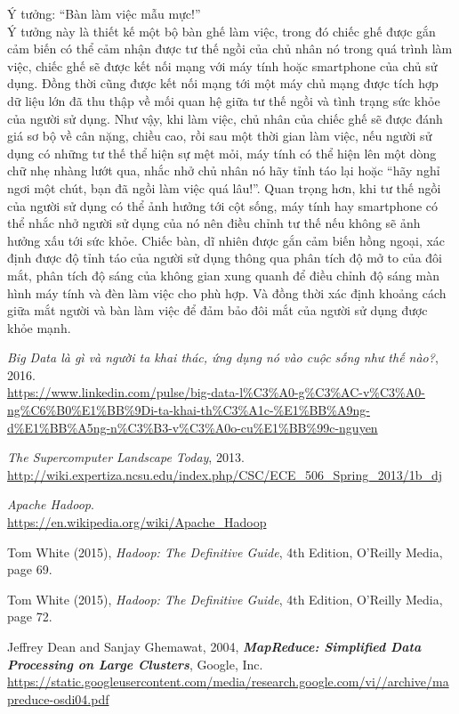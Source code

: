\documentclass[12pt]{report}
\begin{document}
Ý tưởng: “Bàn làm việc mẫu mực!” \\
Ý tưởng này là thiết kế một bộ bàn ghế làm việc, trong đó chiếc ghế được gắn cảm biến có thể cảm nhận được tư thế ngồi của chủ nhân nó trong quá trình làm việc, chiếc ghế sẽ được kết nối mạng với máy tính hoặc smartphone của chủ sử dụng. Đồng thời cũng được kết nối mạng tới một máy chủ mạng được tích hợp dữ liệu lớn đã thu thập về mối quan hệ giữa tư thế ngồi và tình trạng sức khỏe của người sử dụng. Như vậy, khi làm việc, chủ nhân của chiếc ghế sẽ được đánh giá sơ bộ về cân nặng, chiều cao, rồi sau một thời gian làm việc, nếu người sử dụng có những tư thế thể hiện sự mệt mỏi, máy tính có thể hiện lên một dòng chữ nhẹ nhàng lướt qua, nhắc nhở chủ nhân nó hãy tỉnh táo lại hoặc “hãy nghỉ ngơi một chút, bạn đã ngồi làm việc quá lâu!”. Quan trọng hơn, khi tư thế ngồi của người sử dụng có thể ảnh hưởng tới cột sống, máy tính hay smartphone có thể nhắc nhở người sử dụng của nó nên điều chỉnh tư thế nếu không sẽ ảnh hưởng xấu tới sức khỏe. Chiếc bàn, dĩ nhiên được gắn cảm biến hồng ngoại, xác định được độ tỉnh táo của người sử dụng thông qua phân tích độ mở to của đôi mắt, phân tích độ sáng của không gian xung quanh để điều chỉnh độ sáng màn hình máy tính và đèn làm việc cho phù hợp. Và đồng thời xác định khoảng cách giữa mắt người và bàn làm việc để đảm bảo đôi mắt của người sử dụng được khỏe mạnh.

\begin{thebibliography}{30}
\textit{Big Data là gì và người ta khai thác, ứng dụng nó vào cuộc sống như thế nào?}, 2016. \\
\url{https://www.linkedin.com/pulse/big-data-l%C3%A0-g%C3%AC-v%C3%A0-ng%C6%B0%E1%BB%9Di-ta-khai-th%C3%A1c-%E1%BB%A9ng-d%E1%BB%A5ng-n%C3%B3-v%C3%A0o-cu%E1%BB%99c-nguyen}

\textit{The Supercomputer Landscape Today}, 2013. \\
\url{http://wiki.expertiza.ncsu.edu/index.php/CSC/ECE_506_Spring_2013/1b_dj}

\textit{Apache Hadoop}. \\
\url{https://en.wikipedia.org/wiki/Apache_Hadoop}

Tom White (2015), \textit{Hadoop: The Definitive Guide}, 4th Edition, O'Reilly Media, page 69.

Tom White (2015), \textit{Hadoop: The Definitive Guide}, 4th Edition, O'Reilly Media, page 72.

Jeffrey Dean and Sanjay Ghemawat, 2004, \textbf{\it MapReduce: Simplified Data Processing on Large Clusters}, Google, Inc. \\
\url{https://static.googleusercontent.com/media/research.google.com/vi//archive/mapreduce-osdi04.pdf}

\end{thebibliography}
\end{document}

